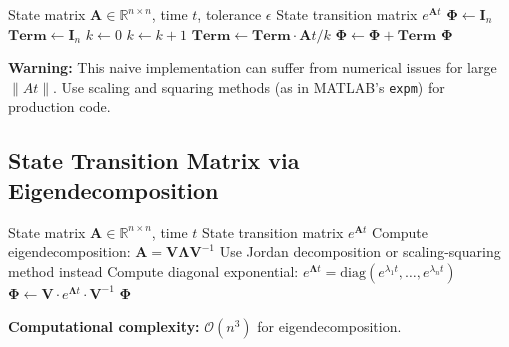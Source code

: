 \begin{algorithm}[H]
\caption{Matrix Exponential via Taylor Series}
\label{alg:matrix_exp_series}
\begin{algorithmic}[1]
\REQUIRE State matrix $\mathbf{A} \in \mathbb{R}^{n \times n}$, time $t$, tolerance $\epsilon$
\ENSURE State transition matrix $e^{\mathbf{A}t}$
\STATE $\mathbf{\Phi} \gets \mathbf{I}_n$ 
\STATE $\mathbf{Term} \gets \mathbf{I}_n$ 
\STATE $k \gets 0$
\REPEAT
    \STATE $k \gets k + 1$
    \STATE $\mathbf{Term} \gets \mathbf{Term} \cdot \mathbf{A}t / k$ 
    \STATE $\mathbf{\Phi} \gets \mathbf{\Phi} + \mathbf{Term}$
\STATE
\RETURN $\mathbf{\Phi}$
\end{algorithmic}
\end{algorithm}

\textbf{Warning:} This naive implementation can suffer from numerical issues for large $\|At\|$. Use scaling and squaring methods (as in MATLAB's \texttt{expm}) for production code.

\subsection{State Transition Matrix via Eigendecomposition}

\begin{algorithm}[H]
\caption{Matrix Exponential via Eigendecomposition}
\label{alg:matrix_exp_eigen}
\begin{algorithmic}[1]
\REQUIRE State matrix $\mathbf{A} \in \mathbb{R}^{n \times n}$, time $t$
\ENSURE State transition matrix $e^{\mathbf{A}t}$
\STATE Compute eigendecomposition: $\mathbf{A} = \mathbf{V}\boldsymbol{\Lambda}\mathbf{V}^{-1}$
\STATE {}
    \STATE Use Jordan decomposition or scaling-squaring method instead
\ENDIF
\STATE
\STATE Compute diagonal exponential: $e^{\boldsymbol{\Lambda}t} = \text{diag}(e^{\lambda_1 t}, \ldots, e^{\lambda_n t})$
\STATE $\mathbf{\Phi} \gets \mathbf{V} \cdot e^{\boldsymbol{\Lambda}t} \cdot \mathbf{V}^{-1}$
\STATE
\RETURN $\mathbf{\Phi}$
\end{algorithmic}
\end{algorithm}

\textbf{Computational complexity:} $\mathcal{O}(n^3)$ for eigendecomposition.

